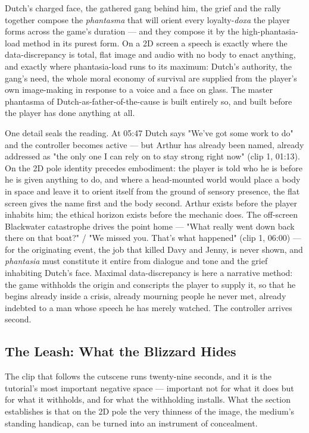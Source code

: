 \documentclass{article}
\begin{document}
Dutch's charged face, the gathered gang behind him, the grief and the rally together compose the \textit{phantasma} that will orient every loyalty-\textit{doxa} the player forms across the game's duration — and they compose it by the high-phantasia-load method in its purest form. On a 2D screen a speech is exactly where the data-discrepancy is total, flat image and audio with no body to enact anything, and exactly where phantasia-load runs to its maximum: Dutch's authority, the gang's need, the whole moral economy of survival are supplied from the player's own image-making in response to a voice and a face on glass. The master phantasma of Dutch-as-father-of-the-cause is built entirely so, and built before the player has done anything at all.

One detail seals the reading. At 05:47 Dutch says "We've got some work to do" and the controller becomes active — but Arthur has already been named, already addressed as "the only one I can rely on to stay strong right now" (clip 1, 01:13). On the 2D pole identity precedes embodiment: the player is told who he is before he is given anything to do, and where a head-mounted world would place a body in space and leave it to orient itself from the ground of sensory presence, the flat screen gives the name first and the body second. Arthur exists before the player inhabits him; the ethical horizon exists before the mechanic does. The off-screen Blackwater catastrophe drives the point home — "What really went down back there on that boat?" / "We missed you. That's what happened" (clip 1, 06:00) — for the originating event, the job that killed Davy and Jenny, is never shown, and \textit{phantasia} must constitute it entire from dialogue and tone and the grief inhabiting Dutch's face. Maximal data-discrepancy is here a narrative method: the game withholds the origin and conscripts the player to supply it, so that he begins already inside a crisis, already mourning people he never met, already indebted to a man whose speech he has merely watched. The controller arrives second.

\bigskip

\subsection*{The Leash: What the Blizzard Hides}

The clip that follows the cutscene runs twenty-nine seconds, and it is the tutorial's most important negative space — important not for what it does but for what it withholds, and for what the withholding installs. What the section establishes is that on the 2D pole the very thinness of the image, the medium's standing handicap, can be turned into an instrument of concealment.
\end{document}
